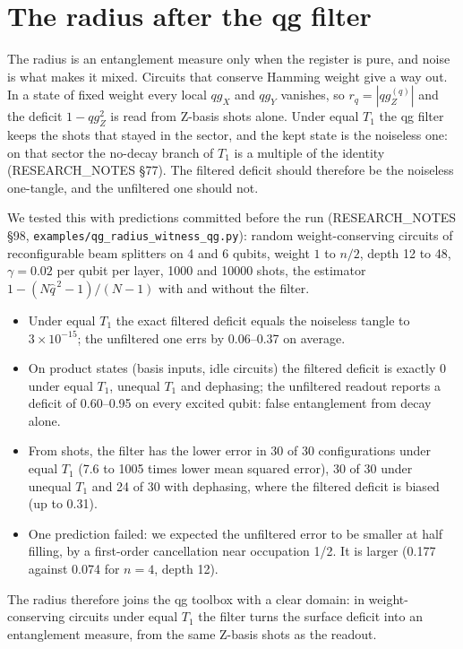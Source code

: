 \documentclass[11pt]{article}
\newcommand{\qZ}{qg_Z}
\newcommand{\qX}{qg_X}
\newcommand{\qY}{qg_Y}
\begin{document}
\section{The radius after the qg filter}

The radius is an entanglement measure only when the register is pure, and noise is what makes it mixed. Circuits
that conserve Hamming weight give a way out. In a state of fixed weight every local $\qX$ and $\qY$ vanishes, so
$r_q=|\qZ^{(q)}|$ and the deficit $1-\qZ^2$ is read from Z-basis shots alone. Under equal $T_1$ the qg filter keeps
the shots that stayed in the sector, and the kept state is the noiseless one: on that sector the no-decay branch of $T_1$ is a multiple of the identity (RESEARCH\_NOTES \S77). The
filtered deficit should therefore be the noiseless one-tangle, and the unfiltered one should not.

We tested this with predictions committed before the run (RESEARCH\_NOTES \S98,
\texttt{examples/qg\_radius\_witness\_qg.py}): random weight-conserving circuits of reconfigurable beam splitters on
4 and 6 qubits, weight $1$ to $n/2$, depth 12 to 48, $\gamma=0.02$ per qubit per layer, 1000 and 10000 shots, the
estimator $1-(N\hat q^{\,2}-1)/(N-1)$ with and without the filter.
\begin{itemize}
\item Under equal $T_1$ the exact filtered deficit equals the noiseless tangle to $3\times10^{-15}$; the unfiltered
one errs by 0.06--0.37 on average.
\item On product states (basis inputs, idle circuits) the filtered deficit is exactly 0 under equal $T_1$, unequal
$T_1$ and dephasing; the unfiltered readout reports a deficit of 0.60--0.95 on every excited qubit: false entanglement
from decay alone.
\item From shots, the filter has the lower error in 30 of 30 configurations under equal $T_1$ (7.6 to 1005 times
lower mean squared error), 30 of 30 under unequal $T_1$ and 24 of 30 with dephasing, where the filtered deficit is
biased (up to 0.31).
\item One prediction failed: we expected the unfiltered error to be smaller at half filling, by a first-order
cancellation near occupation 1/2. It is larger (0.177 against 0.074 for $n=4$, depth 12).
\end{itemize}
The radius therefore joins the qg toolbox with a clear domain: in weight-conserving circuits under equal $T_1$ the
filter turns the surface deficit into an entanglement measure, from the same Z-basis shots as the readout.
\end{document}
